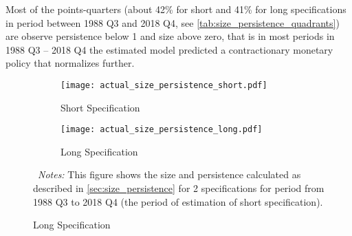 \documentclass[11pt]{article}
\begin{document}
Most of the points-quarters (about 42\% for short and 41\% for long specifications in period between 1988 Q3 and 2018 Q4, see \vref{tab:size_persistence_quadrants}) are observe persistence below 1 and size above zero, that is in most periods in 1988 Q3 -- 2018 Q4 the estimated model predicted a contractionary monetary policy that normalizes further.


\begin{figure}[!hpbt]\centering
  \begin{minipage}{\textwidth}\centering
    \caption{Historical Estimates of Size and Persistence} 
    \label{fig:size_persistence}
    \vspace{1ex}
    \begin{subfigure}[b]{0.494\textwidth}\centering
      \caption{Short Specification}
      \texttt{[image: actual\_size\_persistence\_short.pdf]}
    \end{subfigure}\hfill
    \begin{subfigure}[b]{0.494\textwidth}\centering
      \caption{Long Specification}
      \texttt{[image: actual\_size\_persistence\_long.pdf]}
    \end{subfigure}
    {\begin{flushleft}\scriptsize ~\textit{Notes:} This figure shows the size and persistence calculated as described in \vref{sec:size_persistence} for 2 specifications for period from 1988 Q3 to 2018 Q4 (the period of estimation of short specification).\end{flushleft}} 
    \end{minipage}
    
\end{figure}
\end{document}
